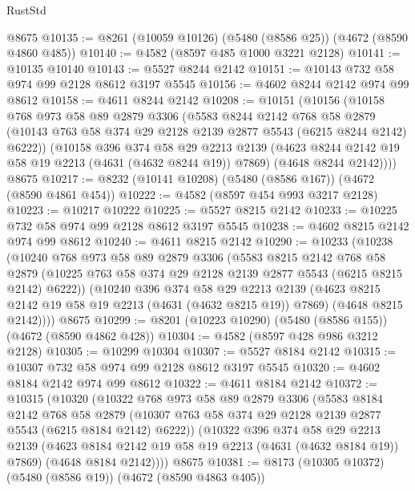 \begin{lexlean}{RustStd}
\begin{coremodule}
    @8675
@10135 := @8261 (@10059 @10126) (@5480 (@8586 @25)) (@4672 (@8590 @4860 @485))
@10140 := @4582 (@8597 @485 @1000 @3221 @2128)
@10141 := @10135 @10140
@10143 := @5527 @8244 @2142
@10151 := @10143 @732 @58 @974 @99 @2128 @8612 @3197 @5545
@10156 := @4602 @8244 @2142 @974 @99 @8612
@10158 := @4611 @8244 @2142
@10208 := @10151
    (@10156
      (@10158
        @768
        @973
        @58
        @89
        @2879
        @3306
        (@5583
          @8244
          @2142
          @768
          @58
          @2879
          (@10143 @763 @58 @374 @29 @2128 @2139 @2877 @5543 (@6215 @8244 @2142) @6222))
        (@10158
          @396
          @374
          @58
          @29
          @2213
          @2139
          (@4623 @8244 @2142 @19 @58 @19 @2213 (@4631 (@4632 @8244 @19)) @7869)
          (@4648 @8244 @2142))))
    @8675
@10217 := @8232 (@10141 @10208) (@5480 (@8586 @167)) (@4672 (@8590 @4861 @454))
@10222 := @4582 (@8597 @454 @993 @3217 @2128)
@10223 := @10217 @10222
@10225 := @5527 @8215 @2142
@10233 := @10225 @732 @58 @974 @99 @2128 @8612 @3197 @5545
@10238 := @4602 @8215 @2142 @974 @99 @8612
@10240 := @4611 @8215 @2142
@10290 := @10233
    (@10238
      (@10240
        @768
        @973
        @58
        @89
        @2879
        @3306
        (@5583
          @8215
          @2142
          @768
          @58
          @2879
          (@10225 @763 @58 @374 @29 @2128 @2139 @2877 @5543 (@6215 @8215 @2142) @6222))
        (@10240
          @396
          @374
          @58
          @29
          @2213
          @2139
          (@4623 @8215 @2142 @19 @58 @19 @2213 (@4631 (@4632 @8215 @19)) @7869)
          (@4648 @8215 @2142))))
    @8675
@10299 := @8201 (@10223 @10290) (@5480 (@8586 @155)) (@4672 (@8590 @4862 @428))
@10304 := @4582 (@8597 @428 @986 @3212 @2128)
@10305 := @10299 @10304
@10307 := @5527 @8184 @2142
@10315 := @10307 @732 @58 @974 @99 @2128 @8612 @3197 @5545
@10320 := @4602 @8184 @2142 @974 @99 @8612
@10322 := @4611 @8184 @2142
@10372 := @10315
    (@10320
      (@10322
        @768
        @973
        @58
        @89
        @2879
        @3306
        (@5583
          @8184
          @2142
          @768
          @58
          @2879
          (@10307 @763 @58 @374 @29 @2128 @2139 @2877 @5543 (@6215 @8184 @2142) @6222))
        (@10322
          @396
          @374
          @58
          @29
          @2213
          @2139
          (@4623 @8184 @2142 @19 @58 @19 @2213 (@4631 (@4632 @8184 @19)) @7869)
          (@4648 @8184 @2142))))
    @8675
@10381 := @8173 (@10305 @10372) (@5480 (@8586 @19)) (@4672 (@8590 @4863 @405))

\end{coremodule}
\end{lexlean}
